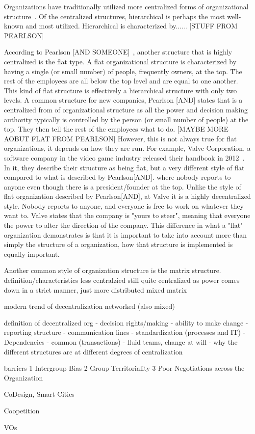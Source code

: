 Organizations have traditionally utilized more centralized forms of organizational structure~\cite{pearlson2009}. Of the centralized structures,  hierarchical is perhaps the most well-known and most utilized. 
Hierarchical is characterized by...... [STUFF FROM PEARLSON]

According to Pearlson [AND SOMEONE]~\cite{pearlson2009}, another structure that is highly centralized is the flat type. A flat organizational structure is characterized by having a single (or small number) of people, frequently owners, at the top. The rest of the employees are all below the top level and are equal to one another. This kind of flat structure is effectively a hierarchical structure with only two levels. A common structure for new companies, Pearlson [AND] states that is a centralized from of organizational structure as all the power and decision making authority typically is controlled by the person (or small number of people) at the top. They then tell the rest of the employees what to do. [MAYBE MORE AOBUT FLAT FROM PEARLSON] However, this is not always true for flat organizations, it depends on how they are run. For example, Valve Corporation, a software company in the video game industry released their handbook in 2012~\cite{valveHandbook}. In it, they describe their structure as being flat, but a very different style of flat compared to what is described by Pearlson[AND]. where nobody reports to anyone even though there is a president/founder at the top. Unlike the style of flat organization described by Pearlson[AND], at Valve it is a highly decentralized style. Nobody reports to anyone, and everyone is free to work on whatever they want to. Valve states that the company is "yours to steer", meaning that everyone the power to alter the direction of the company. This difference in what a "flat" organization demonstrates is that it is important to take into account more than simply the structure of a organization, how that structure is implemented is equally important. 


Another common style of organization structure is the matrix structure.
definition/characteristics 
less centralzied
still quite centralized as power comes down in a strict manner, just more distributed
mixed
matrix


modern trend of decentralization
networked (also mixed)


definition of decentralized org
    - decision rights/making
        - ability to make change
    - reporting structure
    - communication lines
    - standardization (processes and IT)
    - Dependencies - common (transactions)
    - fluid teams, change at will
    - why the different structures are at different degrees of centralization
    

barriers
    1 Intergroup Bias
    2 Group Territoriality
    3 Poor Negotiations across the Organization



CoDesign, Smart Cities

Coopetition

VOs